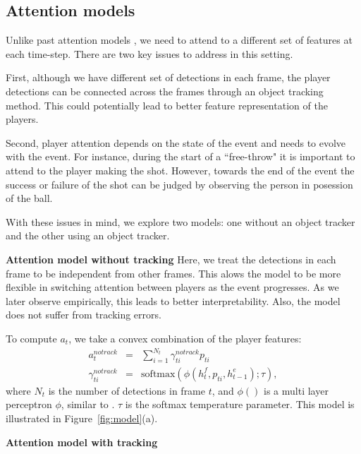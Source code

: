 \subsection{Attention models}

Unlike past attention models \cite{}, we need to attend to a different set of
features at each time-step. There are two key issues to address in this
setting.

First, although we have different set of detections in each frame, the player
detections can be connected across the frames through an object tracking
method. This could potentially lead to better feature representation of the
players.

Second, player attention depends on the state of the event and needs to evolve
with the event.  For instance, during the start of a ``free-throw" it is
important to attend to the player making the shot. However, towards the end of
the event the success or failure of the shot can be judged by observing the
person in posession of the ball.

With these issues in mind, we explore two models:
one without an object tracker and the other using an object tracker.

\noindent \textbf{Attention model without tracking}
Here, we treat the detections in each frame to be independent from other
frames.  This alows the model to be more flexible in switching attention
between players as the event progresses.  As we later observe empirically, this
leads to better interpretability.  Also, the model does not suffer from
tracking errors.

To compute $a_t$, we take a convex combination of the player features:
\begin{eqnarray} 
\label{eq:notrack}
  a_t^{notrack} & = & \sum_{i=1}^{N_t} \gamma_{ti}^{notrack} p_{ti} 
\\ \nonumber
  \gamma_{ti}^{notrack} & = & \text{softmax} \left(\phi\left(h^f_t, p_{ti}, h^e_{t-1}\right); \tau\right),
\end{eqnarray}
where $N_t$ is the number of detections in frame $t$,
and $\phi()$ is a 
multi layer perceptron $\phi$, similar to
\cite{Bahdnau_arxiv14}. 
$\tau$ is the softmax temperature parameter.
This model is illustrated in Figure~\ref{fig:model}(a).

\noindent \textbf{Attention model with tracking}

